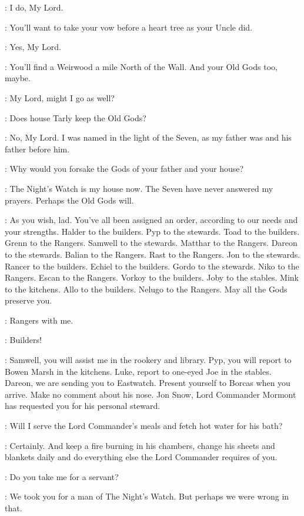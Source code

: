 \JON: I do, My Lord. 

\JEOR: You'll want to take your vow before a heart tree as your Uncle did. 

\JON: Yes, My Lord. 

\JEOR: You'll find a Weirwood a mile North of the Wall. And your Old Gods too, maybe. 

\SAM: My Lord, might I go as well? 

\JEOR: Does house Tarly keep the  Old Gods? 

\SAM: No, My Lord. I was named in the light of the Seven, as my father was and his father before him. 

\JEOR: Why would you forsake the Gods of your father and your house? 

\SAM: The Night's Watch is my house now. The Seven have never answered my prayers. Perhaps the  Old Gods will. 

\JEOR: As you wish, lad. You've all been assigned an order, according to our needs and your strengths. Halder to the builders. Pyp to the stewards. Toad to the builders. Grenn to the Rangers. Samwell to the stewards. Matthar to the Rangers. Dareon to the stewards. Balian to the Rangers. Rast to the Rangers. Jon to the stewards. Rancer to the builders. Echiel to the builders. Gordo to the stewards. Niko to the Rangers. Escan to the Rangers. Vorkoy to the builders. Joby to the stables. Mink to the kitchens. Allo to the builders. Nelugo to the Rangers. May all the Gods preserve you. 

\WATCHMANa: Rangers with me. 

\WATCHMANb: Builders! 

\AEMON: Samwell, you will assist me in the rookery and library. Pyp, you will report to Bowen Marsh in the kitchens. Luke, report to one-eyed Joe in the stables. Dareon, we are sending you to Eastwatch. Present yourself to Borcas when you arrive. Make no comment about his nose. Jon Snow, Lord Commander Mormont has requested you for his personal steward. 

\JON:  Will I serve the Lord Commander's meals and fetch hot water for his bath?

\AEMON: Certainly. And keep a fire burning in his chambers, change his sheets and blankets daily and do everything else the Lord Commander requires of you. 

\JON:  Do you take me for a servant? 

\AEMON: We took you for a man of The Night's Watch. But perhaps we were wrong in that. 


